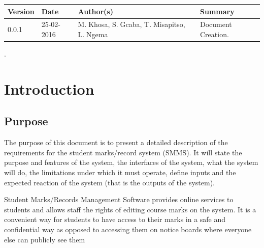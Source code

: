 \documentclass[10pt,onecolumn]{RequimentsGathering}
\begin{document}
\begin{center}
    \begin{tabular}{ | p{2cm} | p{3cm} | p{5cm} | p{5cm} |}
    \hline
    \textbf{Version}& \textbf{Date}& \textbf{Author(s)} & \textbf{Summary} \\ \hline
    0.0.1 & 25-02-2016 & M.$\;$Khosa, S.$\;$Gcaba, T.$\;$Misapitso, L.$\;$Ngema& Document Creation. \\ \hline

    \end{tabular}
\end{center}

\newpage


%
\pagestyle{plain}.
\section{Introduction}
\subsection{Purpose}

The purpose of this document is to present a detailed description of the requirements for the student marks/record system (SMMS). It will state the purpose and features of the system, the interfaces of the system, what the system will do, the limitations under which it must operate, define inputs and the expected reaction of the system (that is the outputs of the system). 

Student Marks/Records Management Software provides online services to students and allows staff the rights of editing course marks on the system. It is a convenient way for students to have access to their marks in a safe and confidential way as opposed to accessing them on notice boards where everyone else can publicly see them
\end{document}
